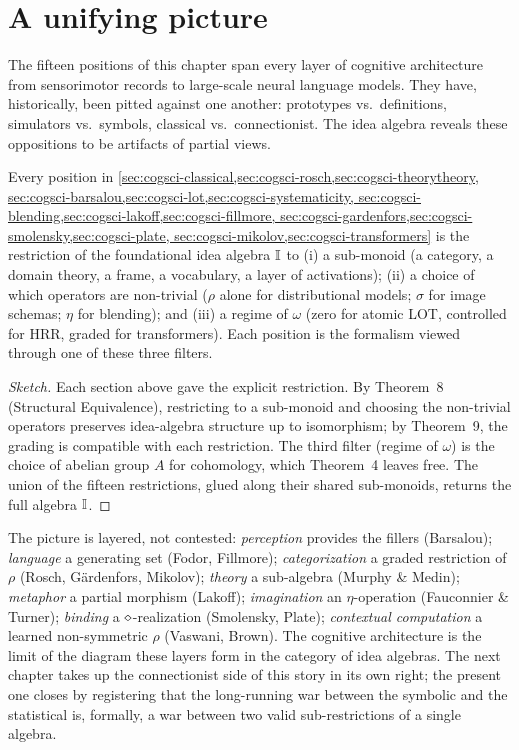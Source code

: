\section{A unifying picture}\label{sec:cogsci-unification}

The fifteen positions of this chapter span every layer of cognitive
architecture from sensorimotor records to large-scale neural language
models. They have, historically, been pitted against one another:
prototypes vs.\ definitions, simulators vs.\ symbols, classical vs.\
connectionist. The idea algebra reveals these oppositions to be artifacts
of partial views.

\begin{theorem}\label{thm:cogsci-layered}
Every position in
\cref{sec:cogsci-classical,sec:cogsci-rosch,sec:cogsci-theorytheory,
sec:cogsci-barsalou,sec:cogsci-lot,sec:cogsci-systematicity,
sec:cogsci-blending,sec:cogsci-lakoff,sec:cogsci-fillmore,
sec:cogsci-gardenfors,sec:cogsci-smolensky,sec:cogsci-plate,
sec:cogsci-mikolov,sec:cogsci-transformers} is the restriction of the
foundational idea algebra $\mathbb{I}$ to (i) a sub-monoid (a category, a
domain theory, a frame, a vocabulary, a layer of activations); (ii) a
choice of which operators are non-trivial ($\rho$ alone for
distributional models; $\sigma$ for image schemas; $\eta$ for blending);
and (iii) a regime of $\omega$ (zero for atomic LOT, controlled for HRR,
graded for transformers). Each position is the formalism viewed through
one of these three filters.
\end{theorem}

\begin{proof}[Sketch]
Each section above gave the explicit restriction. By Theorem~8
(Structural Equivalence), restricting to a sub-monoid and choosing the
non-trivial operators preserves idea-algebra structure up to
isomorphism; by Theorem~9, the grading is compatible with each
restriction. The third filter (regime of $\omega$) is the choice of
abelian group $A$ for cohomology, which Theorem~4 leaves free. The
union of the fifteen restrictions, glued along their shared sub-monoids,
returns the full algebra $\mathbb{I}$. \qedhere
\end{proof}

The picture is layered, not contested: \emph{perception} provides the
fillers (Barsalou); \emph{language} a generating set (Fodor, Fillmore);
\emph{categorization} a graded restriction of $\rho$ (Rosch, G\"ardenfors,
Mikolov); \emph{theory} a sub-algebra (Murphy \& Medin); \emph{metaphor}
a partial morphism (Lakoff); \emph{imagination} an $\eta$-operation
(Fauconnier \& Turner); \emph{binding} a $\mathbin{\diamond}$-realization
(Smolensky, Plate); \emph{contextual computation} a learned non-symmetric
$\rho$ (Vaswani, Brown). The cognitive architecture is the limit of the
diagram these layers form in the category of idea algebras. The next
chapter takes up the connectionist side of this story in its own right;
the present one closes by registering that the long-running war between
the symbolic and the statistical is, formally, a war between two valid
sub-restrictions of a single algebra.

